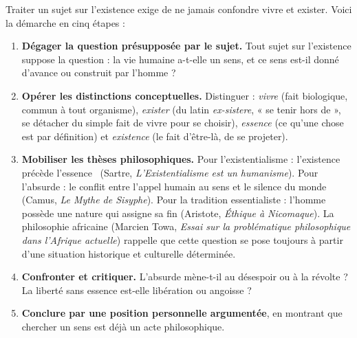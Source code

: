 \documentclass[11pt]{article}
\newcommand{\cle}[1]{{\popxbold\color{popdark}#1}}
\begin{document}
\begin{methode}
Traiter un sujet sur l'existence exige de ne jamais confondre \cle{vivre} et \cle{exister}. Voici la démarche en cinq étapes :
\begin{enumerate}
\item \textbf{Dégager la question présupposée par le sujet.} Tout sujet sur l'existence suppose la question : la vie humaine a-t-elle un sens, et ce sens est-il donné d'avance ou construit par l'homme ?
\item \textbf{Opérer les distinctions conceptuelles.} Distinguer : \emph{vivre} (fait biologique, commun à tout organisme), \emph{exister} (du latin \emph{ex-sistere}, « se tenir hors de », se détacher du simple fait de vivre pour se choisir), \emph{essence} (ce qu'une chose est par définition) et \emph{existence} (le fait d'être-là, de se projeter).
\item \textbf{Mobiliser les thèses philosophiques.} Pour l'existentialisme : \guillemotleft l'existence précède l'essence \guillemotright\ (Sartre, \emph{L'Existentialisme est un humanisme}). Pour l'absurde : le conflit entre l'appel humain au sens et le silence du monde (Camus, \emph{Le Mythe de Sisyphe}). Pour la tradition essentialiste : l'homme possède une nature qui assigne sa fin (Aristote, \emph{Éthique à Nicomaque}). La philosophie africaine (Marcien Towa, \emph{Essai sur la problématique philosophique dans l'Afrique actuelle}) rappelle que cette question se pose toujours à partir d'une situation historique et culturelle déterminée.
\item \textbf{Confronter et critiquer.} L'absurde mène-t-il au désespoir ou à la révolte ? La liberté sans essence est-elle libération ou angoisse ?
\item \textbf{Conclure par une position personnelle argumentée}, en montrant que chercher un sens est déjà un acte philosophique.
\end{enumerate}
\end{methode}
\end{document}
